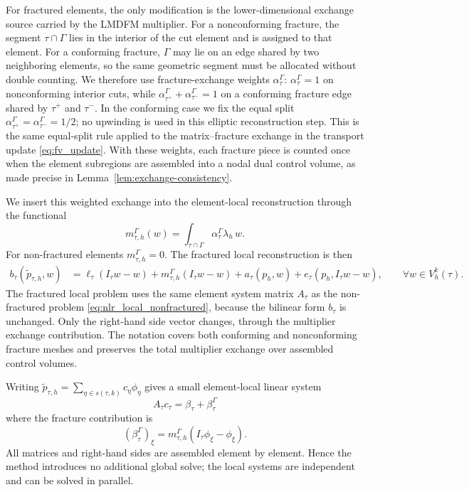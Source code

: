 \documentclass[a4paper,fleqn]{cas-sc}
\begin{document}
For fractured elements, the only modification is the lower-dimensional exchange
source carried by the LMDFM multiplier. For a nonconforming fracture, the
segment \(\tau\cap\Gamma\) lies in the interior of the cut element and is
assigned to that element. For a conforming fracture, \(\Gamma\) may lie on an
edge shared by two neighboring elements, so the same geometric segment must be
allocated without double counting. We therefore use fracture-exchange weights
\(\alpha_\tau^\Gamma\): \(\alpha_\tau^\Gamma=1\) on nonconforming
interior cuts, while
\(\alpha_{\tau^+}^\Gamma+\alpha_{\tau^-}^\Gamma=1\) on a conforming fracture
edge shared by \(\tau^+\) and \(\tau^-\). In the conforming case we fix the
equal split \(\alpha_{\tau^+}^\Gamma=\alpha_{\tau^-}^\Gamma=1/2\); no upwinding
is used in this elliptic reconstruction step. This is the same equal-split rule
applied to the matrix--fracture exchange in the transport update
\eqref{eq:fv_update}. With these weights, each fracture
piece is counted once when the element subregions are assembled into a nodal
dual control volume, as made precise in
Lemma~\ref{lem:exchange-consistency}.

We insert this weighted exchange into the element-local reconstruction through
the functional
\begin{equation}
  m_{\tau,h}^\Gamma(w)
  =
  \int_{\tau\cap\Gamma}
  \alpha_\tau^\Gamma \lambda_h\, w .
  \label{eq:nlr_exchange_functional}
\end{equation}
For non-fractured elements \(m_{\tau,h}^\Gamma=0\). The fractured local
reconstruction is then
\begin{equation}
\begin{aligned}
b_\tau(\widetilde p_{\tau,h},w)
&=
\ell_\tau(I_\tau w-w)
+m_{\tau,h}^\Gamma(I_\tau w-w)
+a_\tau(p_h,w)
+e_\tau(p_h,I_\tau w-w), \qquad \forall w\in V_h^k(\tau).
\end{aligned}
\label{eq:nlr_local_problem}
\end{equation}
The fractured local problem uses the same element system matrix \(A_\tau\) as
the non-fractured problem \eqref{eq:nlr_local_nonfractured}, because the
bilinear form \(b_\tau\) is unchanged. Only the right-hand side vector changes,
through the multiplier exchange contribution. The notation covers both
conforming and nonconforming fracture meshes and preserves the total multiplier
exchange over assembled control volumes.

Writing
\(\widetilde p_{\tau,h}=\sum_{\eta\in s(\tau,k)}c_\eta\phi_\eta\) gives a
small element-local linear system
\[
  A_\tau c_\tau=\beta_\tau+\beta_\tau^\Gamma 
\]
where the fracture contribution is
\[
  (\beta_\tau^\Gamma)_\xi
  =
  m_{\tau,h}^\Gamma(I_\tau\phi_\xi-\phi_\xi).
\]
All matrices and right-hand sides are assembled element by element. Hence the
method introduces no additional global solve; the local systems are independent
and can be solved in parallel.
\end{document}
